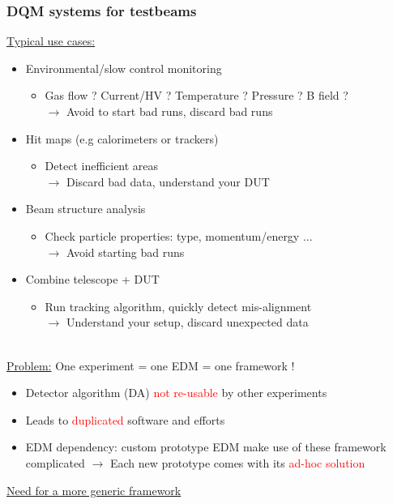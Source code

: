 \documentclass[presentation, 10pt]{beamer}
\begin{document}
\begin{frame}
  \frametitle{DQM systems for testbeams}
  \footnotesize
  \underline{Typical use cases:}
  \begin{itemize}
    \pause
    \item Environmental/slow control monitoring
    \begin{itemize}
      \scriptsize
      \item Gas flow ? Current/HV ? Temperature ? Pressure ? B field ? \\
      $\rightarrow$ Avoid to start bad runs, discard bad runs
    \end{itemize}
    \pause
    \item Hit maps (e.g calorimeters or trackers)
    \begin{itemize}
      \scriptsize
      \item Detect inefficient areas \\
      $\rightarrow$ Discard bad data, understand your DUT
    \end{itemize}
    \pause
    \item Beam structure analysis
    \begin{itemize}
      \scriptsize
      \item Check particle properties: type, momentum/energy ... \\
      $\rightarrow$ Avoid starting bad runs
    \end{itemize}
    \pause
    \item Combine telescope + DUT
    \begin{itemize}
      \scriptsize
      \item Run tracking algorithm, quickly detect mis-alignment \\
      $\rightarrow$ Understand your setup, discard unexpected data 
    \end{itemize}
  \end{itemize}
  ~\\
  \pause
  \underline{Problem:} One experiment = one EDM = one framework !

  \begin{itemize}
    \item Detector algorithm (DA) \textcolor{red}{not re-usable} by other experiments
    \item Leads to \textcolor{red}{duplicated} software and efforts
    \item EDM dependency: custom prototype EDM make use of these framework complicated $\rightarrow$ Each new prototype comes with its \textcolor{red}{ad-hoc solution}
  \end{itemize}
  \pause
  \begin{center} \underline{Need for a more generic framework} \end{center}

\end{frame}
\end{document}
